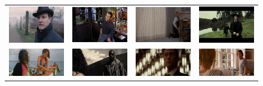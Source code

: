 \begin{figure}
\begin{center}
\begin{tabular}{cccc}
\includegraphics[width=0.2\linewidth]
  {fig/pos/08.jpg} 
& \includegraphics[width=0.2\linewidth]
  {fig/pos/02.jpg}  
& \includegraphics[width=0.2\linewidth]
  {fig/pos/12.jpg}   
& \includegraphics[width=0.2\linewidth]
  {fig/pos/11.jpg}
\\
\includegraphics[width=0.2\linewidth]
  {fig/pos/05.jpg} 
& \includegraphics[width=0.2\linewidth]
  {fig/pos/06.jpg}  
& \includegraphics[width=0.2\linewidth]
  {fig/pos/07.jpg}   
& \includegraphics[width=0.2\linewidth]
  {fig/pos/01.jpg}
\\


\end{tabular}
\end{center}
\end{figure}
